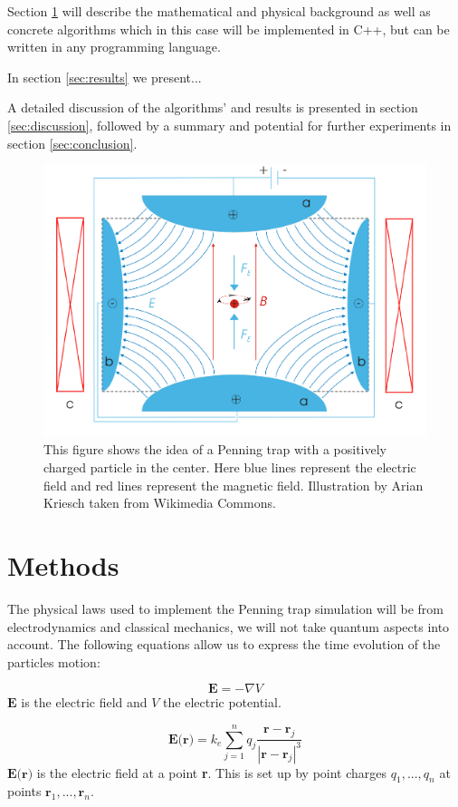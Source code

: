 \documentclass[english,notitlepage,reprint,nofootinbib]{revtex4-1}  %
\begin{document}
Section \ref*{sec:methods} will describe the mathematical and physical background as well as concrete algorithms which in this case will be
implemented in C++, but can be written in any programming language.

In section \ref*{sec:results} we present...

A detailed discussion of the algorithms' and results is presented in section \ref*{sec:discussion}, 
followed by a summary and potential for further experiments in section \ref*{sec:conclusion}.

\begin{figure}[H]
    \centering
    \includegraphics[width=.5\textwidth]{../figures/Penning_trap.pdf}
    \caption{This figure shows the idea of a Penning trap with a positively charged particle in the center. 
    Here blue lines represent the electric field and red lines represent the magnetic field. 
    Illustration by Arian Kriesch taken from Wikimedia Commons.}
    \label{fig:Penning_trap}
\end{figure}

\section{Methods}\label{sec:methods}
The physical laws used to implement the Penning trap simulation will be from electrodynamics and classical mechanics, we will not take quantum aspects into account.
The following equations allow us to express the time evolution of the particles motion:

\begin{equation}
    \textbf{E} = - \nabla V
\end{equation}\label{eq:el_field}
$\textbf{E}$ is the electric field and $V$ the electric potential.

\begin{equation}
    \textbf{E(r)} = k_e \sum_{j=1}^{n} q_j \frac{\textbf{r} - \textbf{r}_j}{|\textbf{r} - \textbf{r}_j|^3}
\end{equation}\label{eq:el_at_r}
$\textbf{E(r)}$ is the electric field at a point \textbf{r}. This is set up by point charges ${q_1,...,q_n}$ at points ${\textbf{r}_1,...,\textbf{r}_n}$.
\end{document}
